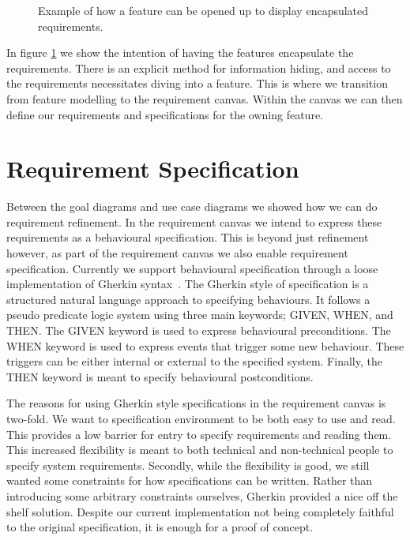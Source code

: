 \begin{figure}
	\centering
	
	\caption{Example of how a feature can be opened up to display encapsulated requirements.}
	\label{fig:feature-requirement}
\end{figure}

In figure \ref{fig:feature-requirement} we show the intention of having the features encapsulate the requirements. There is an explicit method for information hiding, and access to the requirements necessitates diving into a feature. This is where we transition from feature modelling to the requirement canvas. Within the canvas we can then define our requirements and specifications for the owning feature. 

\section{Requirement Specification}

Between the goal diagrams and use case diagrams we showed how we can do requirement refinement. In the requirement canvas we intend to express these requirements as a behavioural specification. This is beyond just refinement however, as part of the requirement canvas we also enable requirement specification. Currently we support behavioural specification through a loose implementation of Gherkin syntax~\cite{cucumberdocs}. The Gherkin style of specification is a structured natural language approach to specifying behaviours. It follows a pseudo predicate logic system using three main keywords; GIVEN, WHEN, and THEN. The GIVEN keyword is used to express behavioural preconditions. The WHEN keyword is used to express events that trigger some new behaviour. These triggers can be either internal or external to the specified system. Finally, the THEN keyword is meant to specify behavioural postconditions. 

The reasons for using Gherkin style specifications in the requirement canvas is two-fold. We want to specification environment to be both easy to use and read. This provides a low barrier for entry to specify requirements and reading them. This increased flexibility is meant to both technical and non-technical people to specify system requirements. Secondly, while the flexibility is good, we still wanted some constraints for how specifications can be written. Rather than introducing some arbitrary constraints ourselves, Gherkin provided a nice off the shelf solution. Despite our current implementation not being completely faithful to the original specification, it is enough for a proof of concept.


